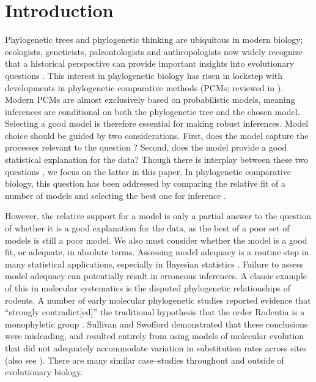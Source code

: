 \documentclass[a4paper,12pt]{article}
\begin{document}
\section{Introduction}

Phylogenetic trees and phylogenetic thinking are ubiquitous in modern biology; ecologists, geneticists, paleontologists and anthropologists now widely recognize that a historical perspective can provide important insights into evolutionary questions \citep{PennellHarmon}. This interest in phylogenetic biology has risen in lockstep with developments in phylogenetic comparative methods (PCMs; reviewed in \citep{PennellHarmon, Omeara2012}). Modern PCMs are almost exclusively based on probabilistic models, meaning inferences are conditional on both the phylogenetic tree and the chosen model. Selecting a good model is therefore essential for making robust inferences. Model choice should be guided by two considerations. First, does the model capture the processes relevant to the question \citep{HansenOrzack2005, Maddison2006, Hansen2012, PennellPE}? 
Second, does the model provide a good statistical explanation for the data? Though there is interplay between these two questions \citep{Hansen2012}, we focus on the latter in this paper. In phylogenetic comparative biology, this question has been addressed by comparing the relative fit of a number of models and selecting the best one for inference \citep{Mooers1999, Harmon2010, Hunt2012}. 

However, the relative support for a model is only a partial answer to the question of whether it is a good explanation for the data, as the best of a poor set of models is still a poor model. We also must consider whether the model is a good fit, or adequate, in absolute terms. Assessing model adequacy is a routine step in many statistical applications, especially in Bayesian statistics \citep{Gelmanbook}. Failure to assess model adequacy can potentially result in erroneous inferences. A classic example of this in molecular systematics is the disputed phylogenetic relationships of rodents. A number of early molecular phylogenetic studies reported evidence that ``strongly contradict[ed]'' the traditional hypothesis that the order Rodentia is a monophyletic group \citep{Graur1991, DErchia1996}. Sullivan and Swofford \citep{SullivanSwofford} demonstrated that these conclusions were misleading, and resulted entirely from using models of molecular evolution that did not adequately accommodate variation in substitution rates across sites (also see \citep{Brown2013}). There are many similar case--studies throughout and outside of evolutionary biology.
\end{document}

